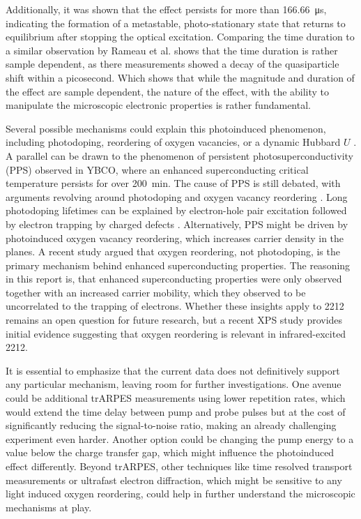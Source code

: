 Additionally, it was shown that the effect persists for more than \qty{166.66}{\micro\second}, indicating the formation of a metastable, photo-stationary state that returns to equilibrium after stopping the optical excitation.
Comparing the time duration to a similar observation by Rameau et al. \cite{rameau_photoinduced_2014} shows that the time duration is rather sample dependent, as there measurements showed a decay of the quasiparticle shift within a picosecond.
Which shows that while the magnitude and duration of the effect are sample dependent, the nature of the effect, with the ability to manipulate the microscopic electronic properties is rather fundamental.

Several possible mechanisms could explain this photoinduced phenomenon, including photodoping, reordering of oxygen vacancies, or a dynamic Hubbard $U$ \cite{baykusheva_ultrafast_2022}.
A parallel can be drawn to the phenomenon of persistent photosuperconductivity (PPS) observed in YBCO, where an enhanced superconducting critical temperature persists for over \qty{200}{\minute}.
The cause of PPS is still debated, with arguments revolving around photodoping and oxygen vacancy reordering \cite{gilabert_photodoping_2000}.
Long photodoping lifetimes can be explained by electron-hole pair excitation followed by electron trapping by charged defects \cite{el_hage_disentangling_2024, kudinov_persistent_1993, kudinov_mechanisms_1994}.
Alternatively, PPS might be driven by photoinduced oxygen vacancy reordering, which increases carrier density in the  planes.
A recent study \cite{el_hage_disentangling_2024} argued that oxygen reordering, not photodoping, is the primary mechanism behind enhanced superconducting properties.
The reasoning in this report is, that enhanced superconducting properties were only observed together with an increased carrier mobility, which they observed to be uncorrelated to the trapping of electrons.
Whether these insights apply to 2212 remains an open question for future research, but a recent XPS study \cite{puntel_out--equilibrium_2024} provides initial evidence suggesting that oxygen reordering is relevant in infrared-excited 2212.

It is essential to emphasize that the current data does not definitively support any particular mechanism, leaving room for further investigations.
One avenue could be additional trARPES measurements using lower repetition rates, which would extend the time delay between pump and probe pulses but at the cost of significantly reducing the signal-to-noise ratio, making an already challenging experiment even harder.
Another option could be changing the pump energy to a value below the charge transfer gap, which might influence the photoinduced effect differently.
Beyond trARPES, other techniques like time resolved transport measurements or ultrafast electron diffraction, which might be sensitive to any light induced oxygen reordering, could help in further understand the microscopic mechanisms at play.

